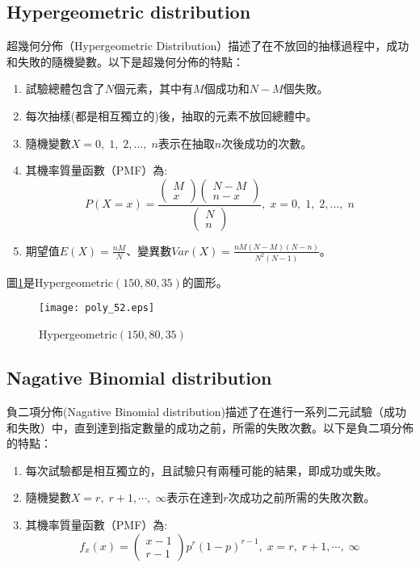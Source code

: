 \documentclass[12pt, a4paper]{article}
\begin{document}
\subsection{Hypergeometric distribution}
超幾何分佈（Hypergeometric Distribution）描述了在不放回的抽樣過程中，成功和失敗的隨機變數。以下是超幾何分佈的特點\;：
\begin{enumerate}
\item 試驗總體包含了\;$N$\;個元素，其中有\;$M$\;個成功和\;$N-M$\;個失敗。
\item 每次抽樣(都是相互獨立的)後，抽取的元素不放回總體中。
\item 隨機變數\;$X=0,\;1,\;2,...,\;n$\;表示在抽取\;$n$\;次後成功的次數。
\item 其機率質量函數（PMF）為\;:
$$P(X=x)=\frac{\left(\begin{array}{c}M\\ x\end{array}\right) \left(\begin{array}{c}N-M\\ n-x\end{array}\right)}{\left(\begin{array}{c}N\\ n\end{array}\right)},\;x=0,\;1,\;2,...,\;n$$
\item 期望值\;$E(X)= \frac{nM}{N}$\;、變異數\;$Var(X)= \frac{nM(N−M)(N−n)}{N^2(N-1)}$\;。
\end{enumerate}

圖\;\ref{fig:poly_52.eps}\;是\;Hypergeometric$(150, 80, 35)$\;的圖形。

\begin{figure}[H]
\centering
\texttt{[image: poly\_52.eps]}
\caption{Hypergeometric$(150, 80, 35)$}
\label{fig:poly_52.eps}
\end{figure}

\subsection{Nagative Binomial distribution}
負二項分佈(Nagative Binomial distribution)描述了在進行一系列二元試驗（成功和失敗）中，直到達到指定數量的成功之前，所需的失敗次數。以下是負二項分佈的特點\;：
\begin{enumerate}
\item 每次試驗都是相互獨立的，且試驗只有兩種可能的結果，即成功或失敗。
\item 隨機變數\;$X=r,\;r+1,\cdots,\;\infty$\;表示在達到\;$r$\;次成功之前所需的失敗次數。
\item 其機率質量函數（PMF）為\;:
$$f_x(x)=\left(\begin{array}{c}x-1\\ r-1\end{array}\right) p^r (1-p)^{r-1},\;x=r,\;r+1,\cdots,\;\infty$$
\end{enumerate}
\end{document}
